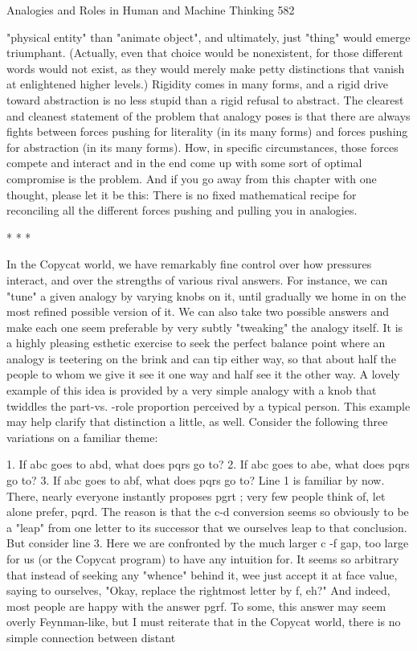 Analogies and Roles in Human and Machine Thinking                                      582

"physical entity" than "animate object", and ultimately, just "thing" would emerge
triumphant. (Actually, even that choice would be nonexistent, for those different
words would not exist, as they would merely make petty distinctions that vanish at
enlightened higher levels.) Rigidity comes in many forms, and a rigid drive toward
abstraction is no less stupid than a rigid refusal to abstract. The clearest and cleanest
statement of the problem that analogy poses is that there are always fights between
forces pushing for literality (in its many forms) and forces pushing for abstraction (in
its many forms). How, in specific circumstances, those forces compete and interact
and in the end come up with some sort of optimal compromise is the problem. And if
you go away from this chapter with one thought, please let it be this: There is no fixed
mathematical recipe for reconciling all the different forces pushing and pulling you in
analogies.

                                       *   *   *

        In the Copycat world, we have remarkably fine control over how pressures
interact, and over the strengths of various rival answers. For instance, we can "tune" a
given analogy by varying knobs on it, until gradually we home in on the most refined
possible version of it. We can also take two possible answers and make each one seem
preferable by very subtly "tweaking" the analogy itself. It is a highly pleasing esthetic
exercise to seek the perfect balance point where an analogy is teetering on the brink
and can tip either way, so that about half the people to whom we give it see it one way
and half see it the other way.
        A lovely example of this idea is provided by a very simple analogy with a
knob that twiddles the part-vs. -role proportion perceived by a typical person. This
example may help clarify that distinction a little, as well. Consider the following three
variations on a familiar theme:

        1. If abc goes to abd, what does pqrs go to?
        2. If abc goes to abe, what does pqrs go to?
        3. If abc goes to abf, what does pqrs go to?
        Line 1 is familiar by now. There, nearly everyone instantly proposes pgrt ;
very few people think of, let alone prefer, pqrd. The reason is that the c-d conversion
seems so obviously to be a "leap" from one letter to its successor that we ourselves
leap to that conclusion. But consider line 3. Here we are confronted by the much
larger c -f gap, too large for us (or the Copycat program) to have any intuition for. It
seems so arbitrary that instead of seeking any "whence" behind it, wee just accept it at
face value, saying to ourselves, "Okay, replace the rightmost letter by f, eh?" And
indeed, most people are happy with the answer pgrf.
        To some, this answer may seem overly Feynman-like, but I must reiterate that
in the Copycat world, there is no simple connection between distant




